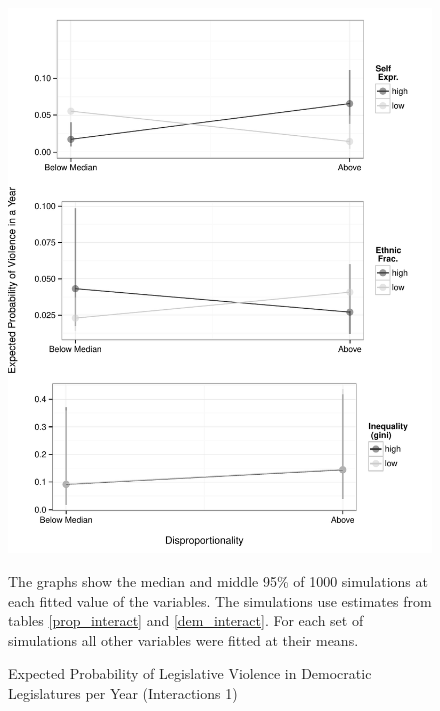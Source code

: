 \documentclass[a4paper]{article}\usepackage[]{graphicx}\usepackage[]{color}
\newenvironment{knitrout}{}{} %
\begin{document}
\begin{figure}
    \begin{center}
\begin{knitrout}
\color{fgcolor}
\includegraphics[width=0.95\linewidth]{figure/predProInteract-1} 

\end{knitrout}

    \end{center}
    \caption{Expected Probability of Legislative Violence in Democratic Legislatures per Year (Interactions 1)}
    \label{interact_plots1}
    \begin{singlespace}
      {\scriptsize{The graphs show the median and middle 95\% of 1000 simulations at each fitted value of the variables. The simulations use estimates from tables \ref{prop_interact} and \ref{dem_interact}. For each set of simulations all other variables were fitted at their means.}}
    \end{singlespace}
\end{figure}
\end{document}
